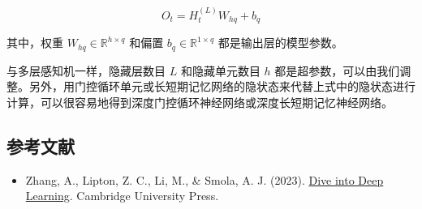 \[
O_t = H_t^{(L)}W_{hq} + b_q
\]

其中，权重 \(W_{hq} \in \mathbb{R}^{h \times q}\) 和偏置 \(b_q \in \mathbb{R}^{1 \times q}\) 都是输出层的模型参数。

与多层感知机一样，隐藏层数目 \(L\) 和隐藏单元数目 \(h\) 都是超参数，可以由我们调整。另外，用门控循环单元或长短期记忆网络的隐状态来代替上式中的隐状态进行计算，可以很容易地得到深度门控循环神经网络或深度长短期记忆神经网络。

\FloatBarrier
{}
\hypertarget{ux53c2ux8003ux6587ux732e-22}{%
\subsection{参考文献}\label{ux53c2ux8003ux6587ux732e-22}}

\vspace{0.25em}
\begin{itemize}
\tightlist
\item
  Zhang, A., Lipton, Z. C., Li, M., \& Smola, A. J. (2023). \href{https://D2L.ai}{Dive into Deep Learning}. Cambridge University Press.
\end{itemize}

\clearpage
